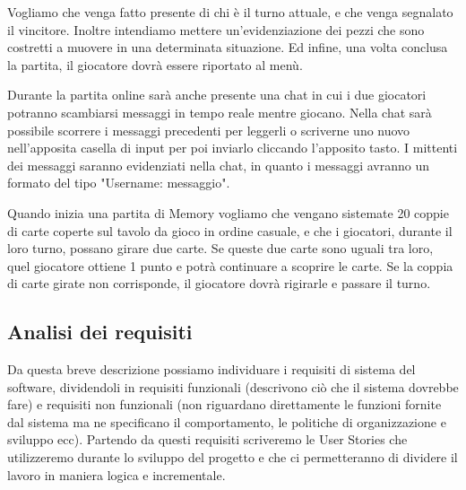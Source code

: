 \documentclass[12pt]{article}
\begin{document}
Vogliamo che venga fatto presente di chi è il turno attuale, e che venga segnalato il vincitore. Inoltre intendiamo mettere un'evidenziazione dei pezzi che sono costretti a muovere in una determinata situazione. Ed infine, una volta conclusa la partita, il giocatore dovrà essere riportato al menù.

Durante la partita online sarà anche presente una chat in cui i due giocatori potranno scambiarsi messaggi in tempo reale mentre giocano. Nella chat sarà possibile scorrere i messaggi precedenti per leggerli o scriverne uno nuovo nell'apposita casella di input per poi inviarlo cliccando l'apposito tasto. I mittenti dei messaggi saranno evidenziati nella chat, in quanto i messaggi avranno un formato del tipo "Username: messaggio".

Quando inizia una partita di Memory vogliamo che vengano sistemate 20 coppie di carte coperte sul tavolo da gioco in ordine casuale, e che i giocatori, durante il loro turno, possano girare due carte. Se queste due carte sono uguali tra loro, quel giocatore ottiene 1 punto e potrà continuare a scoprire le carte. Se la coppia di carte girate non corrisponde, il giocatore dovrà rigirarle e passare il turno.

\subsection{Analisi dei requisiti}
Da questa breve descrizione possiamo individuare i requisiti di sistema del software, dividendoli in requisiti funzionali (descrivono ciò che il sistema dovrebbe fare) e requisiti non funzionali (non riguardano direttamente le funzioni fornite dal sistema ma ne specificano il comportamento, le politiche di organizzazione e sviluppo ecc). Partendo da questi requisiti scriveremo le User Stories che utilizzeremo durante lo sviluppo del progetto e che ci permetteranno di dividere il lavoro in maniera logica e incrementale.
\end{document}
